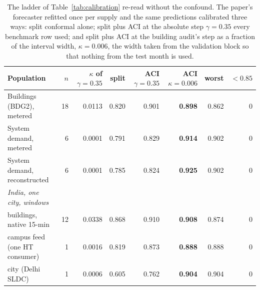 \begin{table}[t]
\centering
\scriptsize
\setlength{\tabcolsep}{3pt}
\begin{tabular}{lrrrrrrr}
\toprule
Population & $n$ & $\kappa$ of $\gamma{=}0.35$ & split & ACI $\gamma{=}0.35$ & ACI $\kappa{=}0.006$ & worst & $<0.85$ \\
\midrule
Buildings (BDG2), metered & 18 & 0.0113 & 0.820 & 0.901 & \textbf{0.898} & 0.862 & 0 \\
System demand, metered & 6 & 0.0001 & 0.791 & 0.829 & \textbf{0.914} & 0.902 & 0 \\
System demand, reconstructed & 6 & 0.0001 & 0.785 & 0.824 & \textbf{0.925} & 0.902 & 0 \\
\midrule
\emph{India, one city, windows} &  &  &  &  &  &  &  \\
\quad buildings, native 15-min & 12 & 0.0338 & 0.868 & 0.910 & \textbf{0.908} & 0.874 & 0 \\
\quad campus feed (one HT consumer) & 1 & 0.0016 & 0.819 & 0.873 & \textbf{0.888} & 0.888 & 0 \\
\quad city (Delhi SLDC) & 1 & 0.0006 & 0.605 & 0.762 & \textbf{0.904} & 0.904 & 0 \\
\bottomrule
\end{tabular}
\caption{The ladder of Table~\ref{tab:calibration} re-read without the confound. The paper's forecaster refitted once per supply and the same predictions calibrated three ways: split conformal alone; split plus ACI at the absolute step $\gamma=0.35$ every benchmark row used; and split plus ACI at the building audit's step as a fraction of the interval width, $\kappa=0.006$, the width taken from the validation block so that nothing from the test month is used.}
\label{tab:aci-step}
\end{table}
